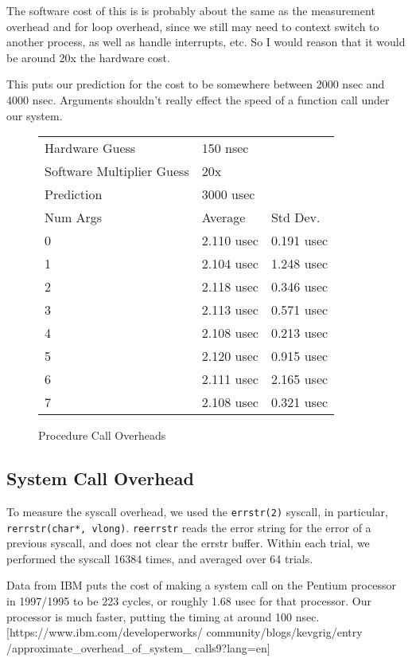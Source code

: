 \documentclass[letterpaper,twocolumn,10pt]{article}
\begin{document}
The software cost of this is is probably about the same as the measurement overhead and for loop overhead, since we still may need to context switch to another process, as well as handle interrupts, etc. So I would reason that it would be around 20x the hardware cost.

This puts our prediction for the cost to be somewhere between 2000 nsec and 4000 nsec. Arguments shouldn't really effect the speed of a function call under our system.

\begin{figure}
	\centering
\begin{tabular}{lll}
Hardware Guess       & 150 nsec & \\
Software Multiplier Guess       & 20x &  \\
Prediction       & 3000 usec &  \\
Num Args & Average    & Std Dev.   \\
0        & 2.110 usec & 0.191 usec \\
1        & 2.104 usec & 1.248 usec \\
2        & 2.118 usec & 0.346 usec \\
3        & 2.113 usec & 0.571 usec \\
4        & 2.108 usec & 0.213 usec \\
5        & 2.120 usec & 0.915 usec \\
6        & 2.111 usec & 2.165 usec \\
7        & 2.108 usec & 0.321 usec
\end{tabular}
\caption{Procedure Call Overheads}
\label{tab:proccalloverheads}
\end{figure}

\subsection{System Call Overhead}

To measure the syscall overhead, we used the \texttt{errstr(2)} syscall, in
particular, \texttt{rerrstr(char*, vlong)}. \texttt{reerrstr} reads the error
string for the error of a previous syscall, and does not clear the errstr
buffer. Within each trial, we performed the syscall 16384 times, and averaged
over 64 trials.

Data from IBM puts the cost of making a system call on the Pentium processor in 1997/1995
to be 223 cycles, or roughly 1.68 usec for that processor. Our processor is much faster,
putting the timing at around 100 nsec.
[https://www.ibm.com/developerworks/ community/blogs/kevgrig/entry /approximate_overhead_of_system_ calls9?lang=en]
\end{document}
